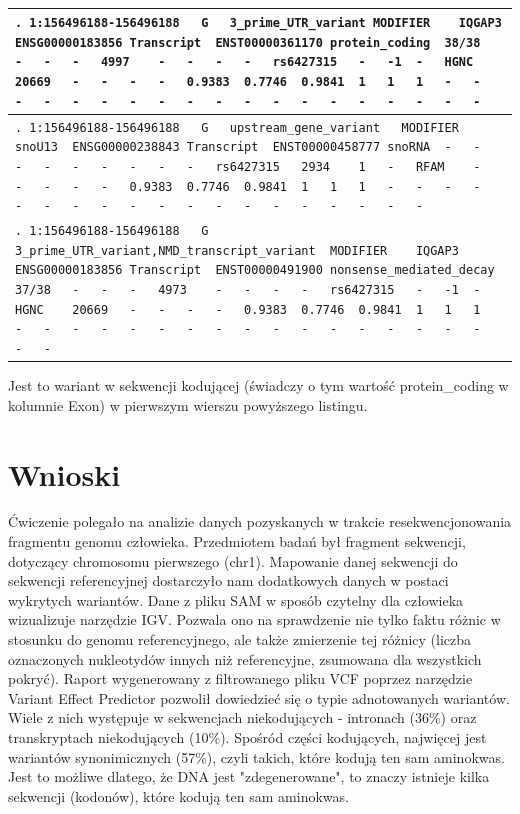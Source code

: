 \documentclass[a4paper]{article}
\begin{document}
\begin{table}[H]
    \caption{
    \label{table:3lines}
    }
\begin{center}
\begin{tabular}{| p{150mm} |}
    \hline
    \verb|.	1:156496188-156496188	G	3_prime_UTR_variant	MODIFIER	IQGAP3	ENSG00000183856	Transcript	ENST00000361170	protein_coding	38/38	-	-	-	4997	-	-	-	-	rs6427315	-	-1	-	HGNC	20669	-	-	-	-	0.9383	0.7746	0.9841	1	1	1	-	-	-	-	-	-	-	-	-	-	-	-	-	-	-	-	-	-	-|
    \\
    \hline
\verb|.	1:156496188-156496188	G	upstream_gene_variant	MODIFIER	snoU13	ENSG00000238843	Transcript	ENST00000458777	snoRNA	-	-	-	-	-	-	-	-	-	rs6427315	2934	1	-	RFAM	-	-	-	-	-	0.9383	0.7746	0.9841	1	1	1	-	-	-	-	-	-	-	-	-	-	-	-	-	-	-	-	-	-	-|
    \\
    \hline
\verb|.	1:156496188-156496188	G	3_prime_UTR_variant,NMD_transcript_variant	MODIFIER	IQGAP3	ENSG00000183856	Transcript	ENST00000491900	nonsense_mediated_decay	37/38	-	-	-	4973	-	-	-	-	rs6427315	-	-1	-	HGNC	20669	-	-	-	-	0.9383	0.7746	0.9841	1	1	1	-	-	-	-	-	-	-	-	-	-	-	-	-	-	-	-	-	-	-|
    \\
    \hline
\end{tabular}
\end{center}
\end{table}

Jest to wariant w sekwencji kodującej (świadczy o tym wartość protein\_coding w kolumnie Exon) w pierwszym wierszu powyższego listingu.
\section{Wnioski}
Ćwiczenie polegało na analizie danych pozyskanych w trakcie resekwencjonowania fragmentu genomu człowieka. Przedmiotem badań był fragment sekwencji, dotyczący chromosomu pierwszego (chr1). Mapowanie danej sekwencji do sekwencji referencyjnej dostarczyło nam dodatkowych danych w postaci wykrytych wariantów. Dane z pliku SAM w sposób czytelny dla człowieka wizualizuje narzędzie IGV. Pozwala ono na sprawdzenie nie tylko faktu różnic w stosunku do genomu referencyjnego, ale także zmierzenie tej różnicy (liczba oznaczonych nukleotydów innych niż referencyjne, zsumowana dla wszystkich pokryć). Raport wygenerowany z filtrowanego pliku VCF poprzez narzędzie Variant Effect Predictor pozwolił dowiedzieć się o typie adnotowanych wariantów. Wiele z nich występuje w sekwencjach niekodujących - intronach (36\%) oraz transkryptach niekodujących (10\%). Spośród części kodujących, najwięcej jest wariantów synonimicznych (57\%), czyli takich, które kodują ten sam aminokwas. Jest to możliwe dlatego, że DNA jest "zdegenerowane", to znaczy istnieje kilka sekwencji (kodonów), które kodują ten sam aminokwas.
\end{document}
